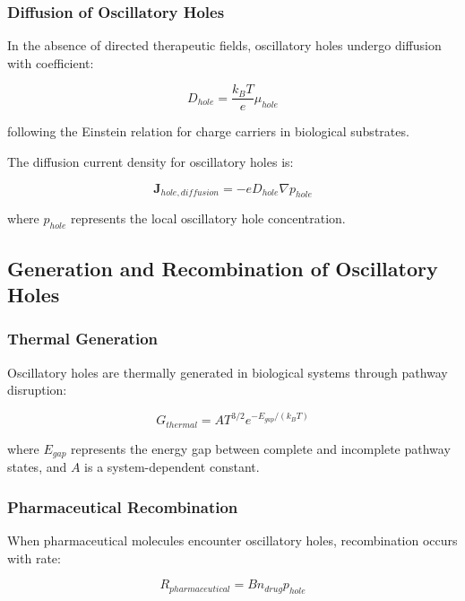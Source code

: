 \documentclass[12pt,a4paper]{article}
\begin{document}
\subsubsection{Diffusion of Oscillatory Holes}

In the absence of directed therapeutic fields, oscillatory holes undergo diffusion with coefficient:

\begin{equation}
D_{hole} = \frac{k_B T}{e} \mu_{hole}
\end{equation}

following the Einstein relation for charge carriers in biological substrates.

The diffusion current density for oscillatory holes is:

\begin{equation}
\mathbf{J}_{hole,diffusion} = -e D_{hole} \nabla p_{hole}
\end{equation}

where $p_{hole}$ represents the local oscillatory hole concentration.

\subsection{Generation and Recombination of Oscillatory Holes}

\subsubsection{Thermal Generation}

Oscillatory holes are thermally generated in biological systems through pathway disruption:

\begin{equation}
G_{thermal} = A T^{3/2} e^{-E_{gap}/(k_B T)}
\end{equation}

where $E_{gap}$ represents the energy gap between complete and incomplete pathway states, and $A$ is a system-dependent constant.

\subsubsection{Pharmaceutical Recombination}

When pharmaceutical molecules encounter oscillatory holes, recombination occurs with rate:

\begin{equation}
R_{pharmaceutical} = B n_{drug} p_{hole}
\end{equation}
\end{document}
